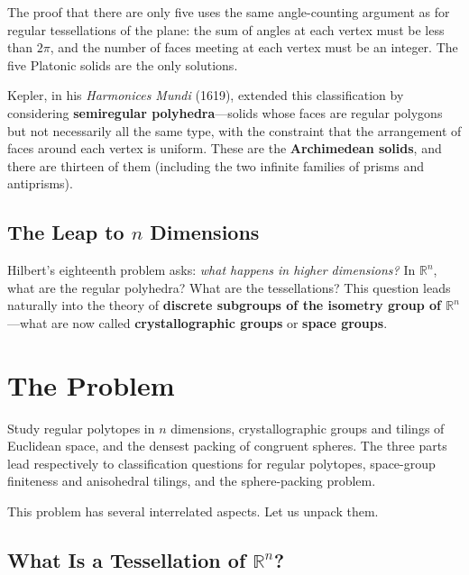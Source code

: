 The proof that there are only five uses the same angle-counting argument as for regular tessellations of the plane: the sum of angles at each vertex must be less than $2\pi$, and the number of faces meeting at each vertex must be an integer. The five Platonic solids are the only solutions.

Kepler, in his \emph{Harmonices Mundi} (1619), extended this classification by considering \textbf{semiregular polyhedra}---solids whose faces are regular polygons but not necessarily all the same type, with the constraint that the arrangement of faces around each vertex is uniform. These are the \textbf{Archimedean solids}, and there are thirteen of them (including the two infinite families of prisms and antiprisms).

\subsection{The Leap to \texorpdfstring{$n$}{n} Dimensions}

Hilbert's eighteenth problem asks: \emph{what happens in higher dimensions?} In $\mathbb{R}^n$, what are the regular polyhedra? What are the tessellations? This question leads naturally into the theory of \textbf{discrete subgroups of the isometry group of $\mathbb{R}^n$}---what are now called \textbf{crystallographic groups} or \textbf{space groups}.

\section{The Problem}

\begin{problem_statement}
Study regular polytopes in $n$ dimensions, crystallographic groups and tilings of Euclidean space, and the densest packing of congruent spheres. The three parts lead respectively to classification questions for regular polytopes, space-group finiteness and anisohedral tilings, and the sphere-packing problem.
\end{problem_statement}

This problem has several interrelated aspects. Let us unpack them.

\subsection{What Is a Tessellation of \texorpdfstring{$\mathbb{R}^n$}{R^n}?}

